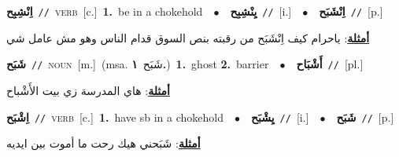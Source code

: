 \documentclass[10pt,a4paper,twoside]{article} %
\begin{document}
\begin{multicols}{2}
{{{{{{\setlength\topsep{0pt}\textbf{\foreignlanguage{arabic}{اِنْشِبِح}}\ {\color{gray}\texttt{//}\color{black}}\ \textsc{verb}\ [c.]\ \textbf{1.}~be in a chokehold\ \ $\bullet$\ \ \setlength\topsep{0pt}\textbf{\foreignlanguage{arabic}{يِنْشِبِح}}\ {\color{gray}\texttt{//}\color{black}}\ [i.]\ \ $\bullet$\ \ \setlength\topsep{0pt}\textbf{\foreignlanguage{arabic}{اِنْشَبَح}}\ {\color{gray}\texttt{//}\color{black}}\ [p.]\  \begin{flushright}\color{gray}\foreignlanguage{arabic}{\textbf{\underline{\foreignlanguage{arabic}{أمثلة}}}: ياحرام كيف اِنْشَبَح من رقبته بنص السوق قدام الناس وهو مش عامل شي}\end{flushright}\color{black}} \vspace{2mm}

{\setlength\topsep{0pt}\textbf{\foreignlanguage{arabic}{شَبَح}}\ {\color{gray}\texttt{//}\color{black}}\ \textsc{noun}\ [m.]\ \color{gray}(msa. \foreignlanguage{arabic}{شَبَح}~\foreignlanguage{arabic}{\textbf{١.}})\color{black}\ \textbf{1.}~ghost  \textbf{2.}~barrier\ \ $\bullet$\ \ \setlength\topsep{0pt}\textbf{\foreignlanguage{arabic}{أَشْبَاح}}\ {\color{gray}\texttt{//}\color{black}}\ [pl.]\  \begin{flushright}\color{gray}\foreignlanguage{arabic}{\textbf{\underline{\foreignlanguage{arabic}{أمثلة}}}: هاي المدرسة زي بيت الأَشْباح}\end{flushright}\color{black}} \vspace{2mm}

{\setlength\topsep{0pt}\textbf{\foreignlanguage{arabic}{اِشْبَح}}\ {\color{gray}\texttt{//}\color{black}}\ \textsc{verb}\ [c.]\ \textbf{1.}~have sb in a chokehold\ \ $\bullet$\ \ \setlength\topsep{0pt}\textbf{\foreignlanguage{arabic}{يِشْبَح}}\ {\color{gray}\texttt{//}\color{black}}\ [i.]\ \ $\bullet$\ \ \setlength\topsep{0pt}\textbf{\foreignlanguage{arabic}{شَبَح}}\ {\color{gray}\texttt{//}\color{black}}\ [p.]\  \begin{flushright}\color{gray}\foreignlanguage{arabic}{\textbf{\underline{\foreignlanguage{arabic}{أمثلة}}}: شَبَحني هيك رحت ما أموت بين ايديه}\end{flushright}\color{black}} \vspace{2mm}

}}}}}
\end{multicols}
\end{document}
